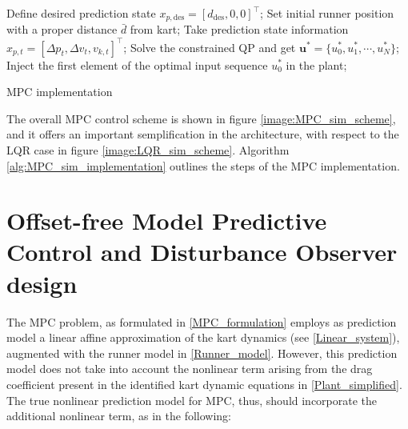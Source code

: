 \documentclass[a4paper,12pt,oneside]{book}
\begin{document}
\begin{algorithm}
\begin{algorithmic}[1]
	\State Define desired prediction state $x_{p,\text{des}} = [d_{\text{des}}, 0, 0]^\top$;
	\State Set initial runner position with a proper distance $\bar{d}$ from kart;
		\State Take prediction state information $x_{p,t} = [\Delta p_t, \Delta v_t, v_{k,t}]^\top$;
		\State Solve the constrained QP and get $\boldsymbol{u}^* = \{u_0^*, u_1^*, \cdots, u_N^*\}$; 
		\State Inject the first element of the optimal input sequence $u_0^*$ in the plant;
	\EndFor
\caption{MPC implementation}
\label{alg:MPC_sim_implementation}
\end{algorithmic}
\end{algorithm}
\bigskip
The overall MPC control scheme is shown in figure \ref{image:MPC_sim_scheme}, and it offers an important semplification in the architecture, with respect to the LQR case in figure \ref{image:LQR_sim_scheme}.
 Algorithm \ref{alg:MPC_sim_implementation} outlines the steps of the MPC implementation.

\section{Offset-free Model Predictive Control and Disturbance Observer design}
The MPC problem, as formulated in \eqref{MPC_formulation} employs as prediction model a linear affine approximation of the kart dynamics (see \eqref{Linear_system}), augmented with the runner model in \eqref{Runner_model}.
However, this prediction model does not take into account the nonlinear term arising from the drag coefficient present in the identified kart dynamic equations in \eqref{Plant_simplified}.
The true nonlinear prediction model for MPC, thus, should incorporate the additional nonlinear term, as in the following:
\end{document}
